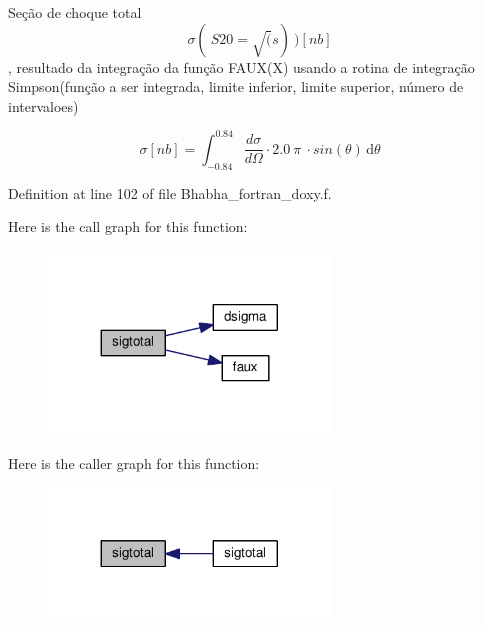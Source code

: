 Seção de choque total \[ \sigma( \ S20 = \sqrt(s) \ ) [nb] \], resultado da integração da função F\+A\+U\+X(\+X) usando a rotina de integração Simpson(função a ser integrada, limite inferior, limite superior, número de intervaloes) 

\[ \sigma[nb] = \int_{-0.84}^{0.84}\! \frac{d\sigma}{d\Omega} \cdot 2.0 \ \pi \ \cdot sin(\theta) \, \mathrm{d}\theta \] 

Definition at line 102 of file Bhabha\+\_\+fortran\+\_\+doxy.\+f.



Here is the call graph for this function\+:\nopagebreak
\begin{figure}[H]
\begin{center}
\leavevmode
\includegraphics[width=212pt]{_bhabha__fortran__doxy_8f_a17b8b02265e091acaccdfb4a9444019f_cgraph}
\end{center}
\end{figure}




Here is the caller graph for this function\+:\nopagebreak
\begin{figure}[H]
\begin{center}
\leavevmode
\includegraphics[width=212pt]{_bhabha__fortran__doxy_8f_a17b8b02265e091acaccdfb4a9444019f_icgraph}
\end{center}
\end{figure}


